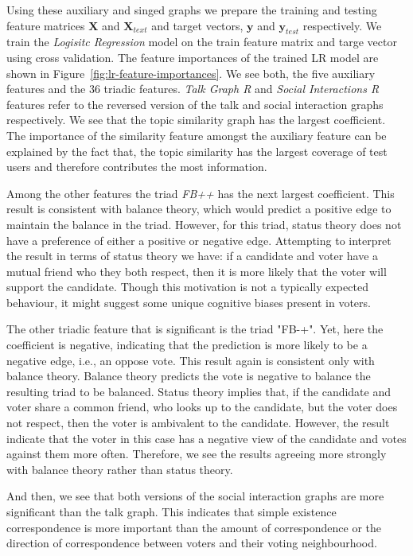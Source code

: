 Using these auxiliary and singed graphs we prepare the training and testing feature matrices $\mathbf{X}$ and $\mathbf{X}_{text}$ and target vectors, $\mathbf{y}$ and $\mathbf{y}_{test}$ respectively.
We train the \textit{Logisitc Regression} model on the train feature matrix and targe vector using cross validation.
The feature importances of the trained LR model are shown in Figure~\ref{fig:lr-feature-importances}.
We see both, the five auxiliary features and the 36 triadic features.
\textit{Talk Graph R} and \textit{Social Interactions R} features refer to the reversed version of the talk and social interaction graphs respectively.
We see that the topic similarity graph has the largest coefficient.
The importance of the similarity feature amongst the auxiliary feature can be explained by the fact that, the topic similarity has the largest coverage of test users and therefore contributes the most information.

Among the other features the triad \textit{FB++} has the next largest coefficient.
This result is consistent with balance theory, which would predict a positive edge to maintain the balance in the triad.
However, for this triad, status theory does not have a preference of either a positive or negative edge.
Attempting to interpret the result in terms of status theory we have: if a candidate and voter have a mutual friend who they both respect, then it is more likely that the voter will support the candidate.
Though this motivation is not a typically expected behaviour, it might suggest some unique cognitive biases present in voters. 

The other triadic feature that is significant is the triad "FB-+".
Yet, here the coefficient is negative, indicating that the prediction is more likely to be a negative edge, i.e., an oppose vote.
This result again is consistent only with balance theory.
Balance theory predicts the vote is negative to balance the resulting triad to be balanced.
Status theory implies that, if the candidate and voter share a common friend, who looks up to the candidate, but the voter does not respect, then the voter is ambivalent to the candidate.
However, the result indicate that the voter in this case has a negative view of the candidate and votes against them more often.
Therefore, we see the results agreeing more strongly with balance theory rather than status theory.

And then, we see that both versions of the social interaction graphs are more significant than the talk graph.
This indicates that simple existence correspondence is more important than the amount of correspondence or the direction of correspondence between voters and their voting neighbourhood.

